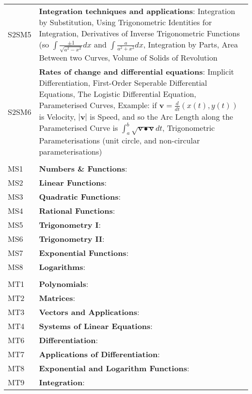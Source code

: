 \documentclass[varwidth=144mm, 12pt]{standalone}
\begin{document}
\begin{longtable}{lp{}}
S2SM5 & \textbf{Integration techniques and applications}: Integration by Substitution, Using Trigonometric Identities for Integration, Derivatives of Inverse Trigonometric Functions (so $\int{\frac{\pm1}{\sqrt{a^2-x^2}}dx}$ and $\int{\frac{a}{a^2+x^2}dx}$, Integration by Parts, Area Between two Curves, Volume of Solids of Revolution \\
S2SM6 & \textbf{Rates of change and differential equations}: Implicit Differentiation, First-Order Seperable Differential Equations, The Logistic Differential Equation, Parameterised Curves, Example: if $\mathbf{v} = \frac{d}{dt}(x(t),y(t))$ is Velocity, $|\mathbf{v}|$ is Speed, and so the Arc Length along the Parameterised Curve is $\int_a^b{\sqrt{\mathbf{v} \bullet \mathbf{v}}dt}$, Trigonometric Parameterisations (unit circle, and non-circular parameterisations) \\
& \\
MS1 & \textbf{Numbers \& Functions}: \\
MS2 & \textbf{Linear Functions}: \\
MS3 & \textbf{Quadratic Functions}: \\
MS4 & \textbf{Rational Functions}: \\
MS5 & \textbf{Trigonometry I}: \\
MS6 & \textbf{Trigonometry II}: \\
MS7 & \textbf{Exponential Functions}: \\
MS8 & \textbf{Logarithms}: \\
& \\
MT1 & \textbf{Polynomials}: \\
MT2 & \textbf{Matrices}: \\
MT3 & \textbf{Vectors and Applications}: \\
MT4 & \textbf{Systems of Linear Equations}: \\
MT6 & \textbf{Differentiation}: \\
MT7 & \textbf{Applications of Differentiation}: \\
MT8 & \textbf{Exponential and Logarithm Functions}: \\
MT9 & \textbf{Integration}: \\
\end{longtable}
\end{document}
